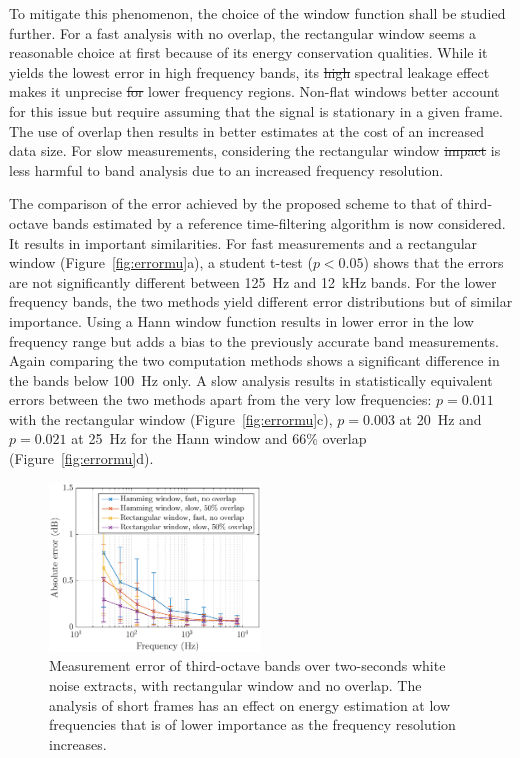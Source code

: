 \documentclass[sensors,article,submit,moreauthors,pdftex,10pt,a4paper]{mdpi}
\providecommand{\DIFaddtex}[1]{{\protect\color{blue}\uwave{#1}}} %
\providecommand{\DIFdeltex}[1]{{\protect\color{red}\sout{#1}}}                      %
\providecommand{\DIFaddbegin}{} %
\providecommand{\DIFaddend}{} %
\providecommand{\DIFdelbegin}{} %
\providecommand{\DIFdelend}{} %
\providecommand{\DIFadd}[1]{\texorpdfstring{\DIFaddtex{#1}}{#1}} %
\providecommand{\DIFdel}[1]{\texorpdfstring{\DIFdeltex{#1}}{}} %
\begin{document}
To mitigate this phenomenon, the choice of the window function shall be studied further. For a fast analysis with no overlap, the rectangular window seems a reasonable choice at first because of its energy conservation qualities. While it yields the lowest error in high frequency bands, its \DIFdelbegin \DIFdel{high }\DIFdelend \DIFaddbegin \DIFadd{important }\DIFaddend spectral leakage effect makes it unprecise \DIFdelbegin \DIFdel{for }\DIFdelend \DIFaddbegin \DIFadd{in }\DIFaddend lower frequency regions. Non-flat windows better account for this issue but require assuming that the signal is stationary in a given frame. The use of overlap then results in better estimates at the cost of an increased data size. For slow measurements, considering the rectangular window \DIFdelbegin \DIFdel{impact }\DIFdelend is less harmful to band analysis due to an increased frequency resolution.

The comparison of the error achieved by the proposed scheme to that of third-octave bands estimated by a reference time-filtering algorithm is now considered. It results in important similarities. For fast measurements and a rectangular window (Figure~\ref{fig:errormu}a), a student t-test ($p<0.05$) shows that the errors are not significantly different between 125~Hz and 12~kHz bands. For the lower frequency bands, the two methods yield different error distributions but of similar importance. Using a Hann window function results in lower error in the low frequency range but adds a bias to the previously accurate band measurements. Again comparing the two computation methods shows a significant difference in the bands below 100~Hz only. A slow analysis results in statistically equivalent errors between the two methods apart from the very low frequencies: $p = 0.011$ with the rectangular window (Figure~\ref{fig:errormu}c), $p = 0.003$ at 20~Hz and $p = 0.021$ at 25~Hz for the Hann window and 66\% overlap (Figure~\ref{fig:errormu}d).\\

\begin{figure}[h!]
    \centering
    \includegraphics[width=0.5\textwidth]{figures/err_m_n.eps}
    \caption{Measurement error of third-octave bands over two-seconds white noise extracts, with rectangular window and no overlap. The analysis of short frames has an effect on energy estimation at low frequencies that is of lower importance as the frequency resolution increases.\label{fig:errormn}}
\end{figure}
\end{document}

